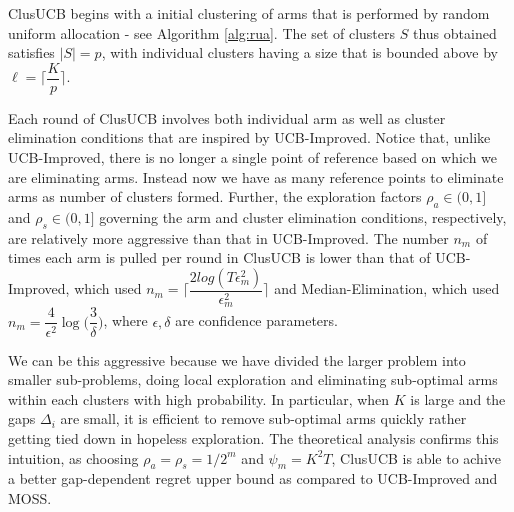 ClusUCB begins with a initial clustering of arms that is performed by random uniform allocation - see Algorithm \ref{alg:rua}. The set of clusters $S$ thus obtained satisfies $|S|=p$, with individual clusters having a size that is bounded above by $\ell=\bigg\lceil \dfrac{K}{p} \bigg\rceil$.

Each round of ClusUCB involves both individual arm as well as cluster elimination conditions that are inspired by UCB-Improved. Notice that, unlike UCB-Improved, there is no longer a single point of reference based on which we are eliminating arms. Instead now we have as many reference points to eliminate arms as number of clusters formed. 
Further, the exploration factors $\rho_{a}\in (0,1]$ and $\rho_{s}\in (0,1]$ governing the arm and cluster elimination conditions, respectively, are relatively more aggressive than that in UCB-Improved. The number $n_m$ of times each arm is pulled per round in ClusUCB is lower than that of UCB-Improved, which used $n_{m}=\bigg\lceil \dfrac{2log(T\epsilon_{m}^{2})}{\epsilon_{m}^{2}} \bigg\rceil$ and Median-Elimination, which used $n_m=\dfrac{4}{\epsilon^{2}}\log\big(\dfrac{3}{\delta}\big)$, where $\epsilon,\delta$ are confidence parameters.

We can be this aggressive because we have divided the larger problem into smaller sub-problems, doing local exploration and eliminating sub-optimal arms within each clusters with high probability. In particular, when $K$ is large and the gaps $\Delta_i$ are small, it is efficient to remove sub-optimal arms quickly rather getting tied down in hopeless exploration. 
The theoretical analysis confirms this intuition, as choosing $\rho_a=\rho_s = 1/2^m$ and $\psi_m=K^2T$, ClusUCB is able to achive a better gap-dependent regret upper bound as compared to UCB-Improved and MOSS. 

